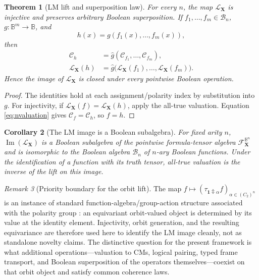 \documentclass[11pt]{article}
\newtheorem{theorem}{Theorem}[section]
\newtheorem{corollary}[theorem]{Corollary}
\theoremstyle{definition}
\theoremstyle{remark}
\newtheorem{remark}[theorem]{Remark}
\newcommand{\B}{\mathbb B}
\newcommand{\cF}{\mathcal F}
\newcommand{\cC}{\mathcal C}
\newcommand{\xor}{\mathbin{\Updownarrow}}
\begin{document}
\begin{theorem}[LM lift and superposition law]
For every $n$, the map $\mathcal L_{\mathbf X}$ is injective and preserves arbitrary Boolean superposition.  If $f_1,\ldots,f_m\in\mathcal B_n$, $g:\B^m\to\B$, and
\[
 h(x)=g(f_1(x),\ldots,f_m(x)),
\]
then
\begin{align}
 \cC_h&=\widehat g(\cC_{f_1},\ldots,\cC_{f_m}),
 \label{eq:numericclosure}\\
 \mathcal L_{\mathbf X}(h)
 &=\widehat g\bigl(\mathcal L_{\mathbf X}(f_1),\ldots,
                    \mathcal L_{\mathbf X}(f_m)\bigr).
 \label{eq:symbolicclosure}
\end{align}
Hence the image of $\mathcal L_{\mathbf X}$ is closed under every pointwise Boolean operation.
\end{theorem}
\begin{proof}
The identities hold at each assignment/polarity index by substitution into $g$.  For injectivity, if $\mathcal L_{\mathbf X}(f)=\mathcal L_{\mathbf X}(h)$, apply the all-true valuation.  Equation \eqref{eq:nvaluation} gives $\cC_f=\cC_h$, so $f=h$.
\end{proof}

\begin{corollary}[The LM image is a Boolean subalgebra]
For fixed arity $n$, $\operatorname{Im}(\mathcal L_{\mathbf X})$ is a Boolean subalgebra of the pointwise formula-tensor algebra $\cF_{\mathbf X}^{\B^n}$ and is isomorphic to the Boolean algebra $\mathcal B_n$ of $n$-ary Boolean functions.  Under the identification of a function with its truth tensor, all-true valuation is the inverse of the lift on this image.
\end{corollary}

\begin{remark}[Priority boundary for the orbit lift]
The map $f\mapsto(\tau_{\mathbf1\xor\alpha} f)_{\alpha\in(C_2)^n}$ is an instance of standard function-algebra/group-action structure associated with the polarity group \cite{Burris1981}: an equivariant orbit-valued object is determined by its value at the identity element.  Injectivity, orbit generation, and the resulting equivariance are therefore used here to identify the LM image cleanly, not as standalone novelty claims.  The distinctive question for the present framework is what additional operations---valuation to CMs, logical pairing, typed frame transport, and Boolean superposition of the operators themselves---coexist on that orbit object and satisfy common coherence laws.
\end{remark}
\end{document}
